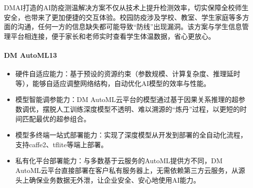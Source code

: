 \documentclass[letterpaper,11pt,english]{sphinxmanual}
\begin{document}
DMAI打造的AI防疫测温解决方案不仅从技术上提升检测效率，切实保障全校师生安全，也带来了更加便捷的交互体验。校园防疫涉及学校、教室、学生家庭等多方面的沟通，任何一方的信息缺失都可能导致“防线”出现漏洞。该方案与学生信息管理平台相连接，便于家长和老师实时查看学生体温数据，省心更放心。%
\begin{footnote}[325]\sphinxAtStartFootnote
{}
%
\end{footnote}


\paragraph{DM AutoML13\sphinxfootnotemark[326]}
\label{\detokenize{chapter_dive/dm-ai:dm-automl13}}%
\begin{footnotetext}[326]\sphinxAtStartFootnote
{}
%
\end{footnotetext}\ignorespaces \begin{itemize}
\item {} 
硬件自适应能力：基于预设的资源约束（参数规模、计算复杂度、推理延时等），能够自适应调整网络结构，自动优化AI模型的效率与性能。

\item {} 
模型智能调参能力：DM
AutoML云平台的模型通过基于因果关系推理的超参数调优，摆脱人工训练深度模型不透明、难以溯源的“炼丹”过程，以更短的时间匹配最优的超参组合。

\item {} 
模型多终端一站式部署能力：实现了深度模型从开发到部署的全自动化流程，支持caffe2、tf\sphinxhyphen{}lite等端上部署。

\item {} 
私有化平台部署能力：与多数基于云服务的AutoML提供方不同，DM
AutoML云平台直接部署在客户私有服务器上，无需依赖第三方云服务，从源头上确保业务数据无外泄，让企业安全、安心地使用AI能力。

\end{itemize}
\end{document}
